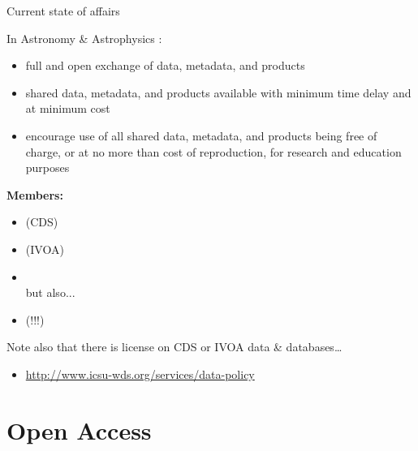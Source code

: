 \documentclass[10pt,xcolor=svgnames]{beamer}
\begin{document}
\begin{frame}{Current state of affairs}

  \begin{block}{In Astronomy \& Astrophysics}
    :
    {\small
    \begin{itemize}
      \item full and open exchange of data, metadata, and products
      \item shared data, metadata, and products available with minimum time delay and at minimum cost
      \item encourage use of all shared data, metadata, and products being free of charge, or at no more than cost of reproduction, for research and education purposes
    \end{itemize}
    }

    \textbf{Members:}
    \begin{itemize}
      \item {} (CDS)
      \item {} (IVOA)
      \item {} \\ \hspace{-2em}but also...
      \item {} (!!!)
    \end{itemize}
    
    {\small Note also that there is  license on CDS or IVOA data \& databases\ldots}

  \end{block}

    {\scriptsize
    \begin{itemize}
      \item \url{http://www.icsu-wds.org/services/data-policy}
    \end{itemize}
    }

\end{frame}

\section{Open Access}
\end{document}
